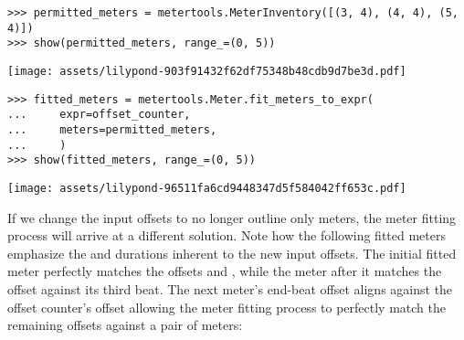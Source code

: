 \begin{abjadbookoutput}
\begin{singlespacing}
\vspace{-0.5\baselineskip}
\begin{verbatim}
>>> permitted_meters = metertools.MeterInventory([(3, 4), (4, 4), (5, 4)])
>>> show(permitted_meters, range_=(0, 5))
\end{verbatim}
\noindent\texttt{[image: assets/lilypond-903f91432f62df75348b48cdb9d7be3d.pdf]}
\begin{verbatim}
>>> fitted_meters = metertools.Meter.fit_meters_to_expr(
...     expr=offset_counter,
...     meters=permitted_meters,
...     )
>>> show(fitted_meters, range_=(0, 5))
\end{verbatim}
\noindent\texttt{[image: assets/lilypond-96511fa6cd9448347d5f584042ff653c.pdf]}
\end{singlespacing}
\end{abjadbookoutput}

\noindent If we change the input offsets to no longer outline only 
meters, the meter fitting process will arrive at a different solution. Note how
the following fitted meters emphasize the  and 
durations inherent to the new input offsets. The initial  fitted
meter perfectly matches the offsets  and , while the
 meter after it matches the  offset against its third
beat. The next meter's end-beat offset aligns against the offset counter's
 offset allowing the meter fitting process to perfectly match the
remaining offsets against a pair of  meters:

\begin{comment}
<abjad>
offset_counter = metertools.OffsetCounter([
    (0, 4), (3, 4), (5, 4), (10, 4), (15, 4), (20, 4),
    ])
fitted_meters = metertools.Meter.fit_meters_to_expr(
    expr=offset_counter,
    meters=permitted_meters,
    )
show(offset_counter, range_=(0, 5))
show(fitted_meters, range_=(0, 5))
</abjad>
\end{comment}

